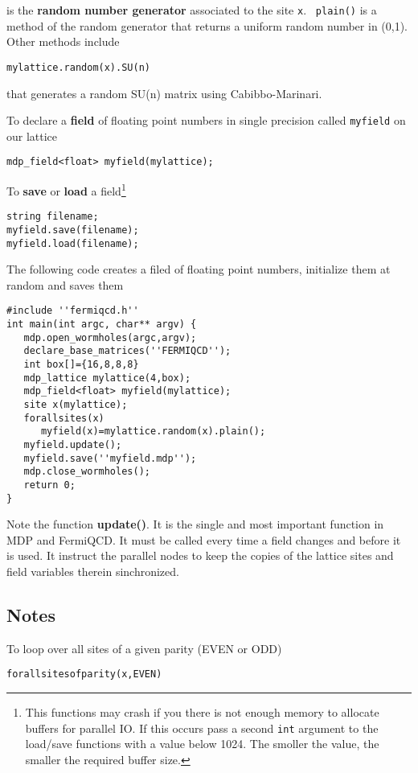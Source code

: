 is the {\bf random number generator} associated to the site {\tt x}. {\tt %
plain()} is a method of the random generator that returns a uniform random
number in (0,1). Other methods include
\begin{verbatim}
mylattice.random(x).SU(n)
\end{verbatim}

that generates a random SU(n) matrix using Cabibbo-Marinari.

To declare a {\bf field} of floating point numbers in single precision
called {\tt myfield} on our lattice
\begin{verbatim}
mdp_field<float> myfield(mylattice);
\end{verbatim}

To {\bf save} or {\bf load} a field\footnote{%
This functions may crash if you there is not enough memory to allocate
buffers for parallel IO. If this occurs pass a second {\tt int} argument to
the load/save functions with a value below 1024. The smoller the value, the
smaller the required buffer size.}
\begin{verbatim}
string filename;
myfield.save(filename);
myfield.load(filename);
\end{verbatim}

The following code creates a filed of floating point numbers, initialize
them at random and saves them
\begin{verbatim}
#include ''fermiqcd.h''
int main(int argc, char** argv) {
   mdp.open_wormholes(argc,argv);
   declare_base_matrices(''FERMIQCD'');
   int box[]={16,8,8,8}
   mdp_lattice mylattice(4,box);
   mdp_field<float> myfield(mylattice);
   site x(mylattice);
   forallsites(x) 
      myfield(x)=mylattice.random(x).plain();
   myfield.update();
   myfield.save(''myfield.mdp'');
   mdp.close_wormholes();
   return 0;
}
\end{verbatim}

Note the function {\bf update()}. It is the single and most important
function in MDP and FermiQCD. It must be called every time a field changes
and before it is used. It instruct the parallel nodes to keep the copies of
the lattice sites and field variables therein sinchronized.

\subsection{Notes}

To loop over all sites of a given parity (EVEN or ODD)
\begin{verbatim}
forallsitesofparity(x,EVEN)
\end{verbatim}

